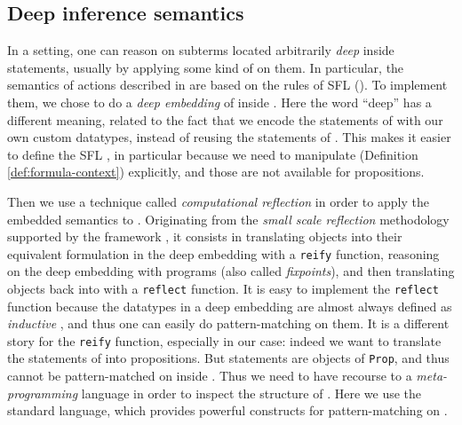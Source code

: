 \subsection{Deep inference semantics}

In a  setting, one can reason on subterms located arbitrarily
\emph{deep} inside statements, usually by applying some kind of  on them. In particular, the semantics of  actions described in
 are based on the rules of SFL (). To implement them, we
chose to do a \emph{deep embedding} of  inside .
Here the word ``deep'' has a different meaning, related to the fact that we
encode the statements of  with our own custom datatypes,
instead of reusing the statements of . This makes it easier to define
the SFL , in particular because we need to manipulate
\emph{} (Definition \ref{def:formula-context}) explicitly, and those are
not available for  propositions.

Then we use a technique called \emph{computational reflection} in order to apply
the embedded  semantics to  . Originating from the
\emph{small scale reflection} methodology supported by the {\ssreflect}
framework \cite{SSR}, it consists in translating  objects into their
equivalent formulation in the deep embedding with a \texttt{reify} function,
reasoning on the deep embedding with  programs (also called
\emph{fixpoints}), and then translating objects back into  with a
\texttt{reflect} function. It is easy to implement the \texttt{reflect} function
because the datatypes in a deep embedding are almost always defined as
\emph{inductive} , and thus one can easily do pattern-matching on them. It
is a different story for the \texttt{reify} function, especially in our case:
indeed we want to translate the statements of   into 
propositions. But  statements are objects of  \texttt{Prop}, and thus
cannot be pattern-matched on inside .
Thus we need to have recourse to a \emph{meta-programming} language in order to
inspect the structure of  . Here we use the standard {\ltac} language,
which provides powerful constructs for pattern-matching on .

